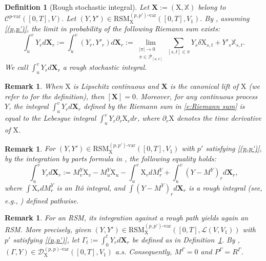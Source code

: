 \documentclass[11pt,reqno]{amsart}
\newtheorem{definition}[lemma]{Definition}
\newtheorem{remark}[lemma]{Remark}
\numberwithin{equation}{section}
\begin{document}
\begin{definition}[Rough stochastic integral]\label{def:def of int}
Let $\mathbf X:=(\mathrm X, \mathbb X)$ belong to $ \mathscr{C}^{p\text{-}\mathrm{var}}([0,T],V)$. Let $(Y,Y')\in \mathrm{RSM}^{(p,p')\text{-}\mathrm{var}}_{\mathrm X}([0,T],V_1)$. By \cite[Theorem~1.7]{friz2023rough}, assuming \ref{(p,p')}, the limit in probability of the following Riemann sum exists:
\begin{equation}\label{e:Riemann sum}
\int_{u}^{v} Y_r d\mathbf X_r := \int_{u}^{v} (Y_r,Y'_r) d\mathbf X_r:= \lim_{\substack{|\pi|\to 0\\ \pi \in \mathcal P_{[u,v]}}}\sum_{[s,t]\in\pi} Y_{s}\delta \mathrm X_{s,t} + Y'_{s} \mathbb X_{s,t}.
\end{equation}
We call $\int_{u}^{v} Y_r d\mathbf X_r$ a rough stochastic integral.
\end{definition}

\begin{remark}\label{rem:degenerate Lebesgue}
When $\mathrm X$ is Lipschitz continuous and $\mathbf X$ is the canonical lift of $\mathrm X$ (we refer to \cite[Definition~7.2]{friz2010multidimensional} for the definition), then $[\mathbf X] = 0$. Moreover, for any continuous process $Y$, the integral $\int_{u}^{v} Y_{r} d\mathbf X_{r}$ defined by the Riemann sum in \eqref{e:Riemann sum} is equal to the Lebesgue integral $\int_{u}^{v} Y_{r} \partial_{r}\mathrm X_r dr$, where $\partial_r \mathrm X $ denotes the time derivative of $\mathrm X$. 
\end{remark}

\begin{remark}\label{rem:int by parts}
For $(Y,Y')\in \mathrm{RSM}^{(p,p')\text{-}\mathrm{var}}_{\mathrm X}([0,T],V_1)$ with $p'$ satisfying \ref{(p,p')}, by the integration by parts formula in \cite[Section~5.3]{friz2023rough}, the following equality holds:
\begin{equation}\label{e:def of inte}
\int_{u}^{v} Y_{r} d\mathbf X_{r} := M^{Y}_{v}\mathrm X_{v} - M^{Y}_{u}\mathrm X_{u} - \int_{u}^{v} \mathrm X_{r} dM^{Y}_{r} + \int_{u}^{v} (Y - M^{Y})_r d\mathbf X_{r}, 
\end{equation}
where $\int \mathrm X_{r} dM^{Y}_r$ is an It\^o integral, and $\int (Y - M^{Y})_r d\mathbf X_r$ is a  rough integral (see, e.g., \cite{friz2020course}) defined pathwise. 
\end{remark}


\begin{remark}\label{rem:Gamma-RSM}
For an \emph{RSM}, its integration against a rough path yields again an \emph{RSM}. 
More precisely, given $(Y, Y')\in\mathrm{RSM}^{(p,p')\text{-}\mathrm{var}}_{\mathrm X}([0,T],\mathscr L(V,V_1))$ with $p'$ satisfying \ref{(p,p')}, let $\Gamma_t := \int_{0}^{t} Y_r d\mathbf X_{r}$ be defined as in Definition~\ref{def:def of int}. 
By \cite[Theorem~1.7]{friz2023rough},
$(\Gamma, Y)\in\mathscr{D}^{(p,p)\text{-}\mathrm{var}}_{\mathrm X}([0,T],V_1)$ a.s. Consequently, $M^{\Gamma} = 0$ and $P^{\Gamma} = R^{\Gamma}$. 
\end{remark}
\end{document}
